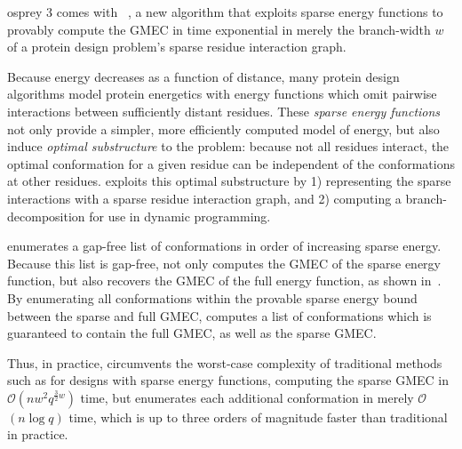 \def\Oh{$\mathcal{O}$}

{\sc osprey} 3 comes with {\bwmstar}~\cite{BWM_JCB}, a new algorithm that exploits sparse energy functions to provably compute the GMEC in time exponential in merely the branch-width $w$ of a protein design problem's sparse residue interaction graph.

Because energy decreases as a function of distance, many protein design algorithms model protein energetics with energy functions which omit pairwise interactions between sufficiently distant residues. These \emph{sparse energy functions} not only provide a simpler, more efficiently computed model of energy, but also induce \emph{optimal substructure} to the problem: because not all residues interact, the optimal conformation for a given residue can be independent of the conformations at other residues. {\bwmstar} exploits this optimal substructure by 1) representing the sparse interactions with a sparse residue interaction graph, and 2) computing a branch-decomposition for use in dynamic programming. 

{\bwmstar} enumerates a gap-free list of conformations in order of increasing sparse energy. Because this list is gap-free, {\bwmstar} not only computes the GMEC of the sparse energy function, but also recovers the GMEC of the full energy function, as shown in~\cite{BWM_JCB}. By enumerating all conformations within the provable sparse energy bound between the sparse and full GMEC, {\bwmstar} computes a list of conformations which is guaranteed to contain the full GMEC, as well as the sparse GMEC.

Thus, in practice, {\bwmstar} circumvents the worst-case complexity of traditional methods such as \as for designs with sparse energy functions, computing the sparse GMEC in \Oh$(nw^2q^{\frac{3}{2}w})$ time, but enumerates each additional conformation in merely \Oh$(n\log q)$ time, which is up to three orders of magnitude faster than traditional \as in practice.